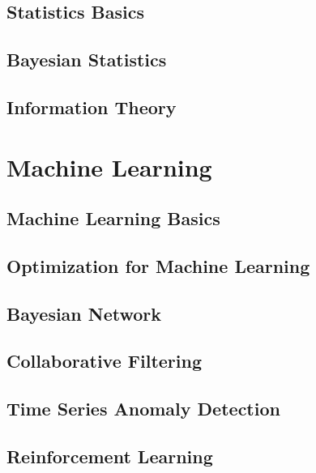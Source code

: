 \documentclass[10pt, twoside]{book}   	%
\begin{document}
\chapter{Statistics Basics}


\chapter{Bayesian Statistics}


\chapter{Information Theory}


\part{Machine Learning}

\chapter{Machine Learning Basics}


\chapter{Optimization for Machine Learning}



\chapter{Bayesian Network}



\chapter{Collaborative Filtering}


\chapter{Time Series Anomaly Detection}


\chapter{Reinforcement Learning}



\iffalse
\appendix
\appendixpage
\addappheadtotoc


\chapter{Amazon Machine Learning University}



\fi
\end{document}
